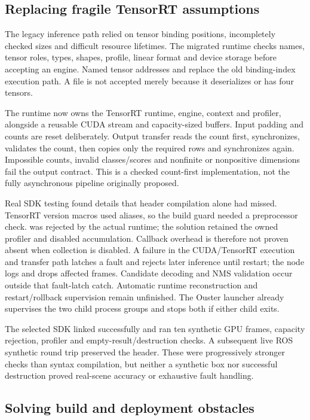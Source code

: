 \documentclass[11pt,a4paper]{article}
\newcommand{\code}[1]{\texttt{\detokenize{#1}}}
\begin{document}
\subsection{Replacing fragile TensorRT assumptions}

The legacy inference path relied on tensor binding positions, incompletely checked sizes and difficult resource lifetimes. The migrated runtime checks names, tensor roles, types, shapes, profile, linear format and device storage before accepting an engine. Named tensor addresses and \code{enqueueV3} replace the old binding-index execution path. A file is not accepted merely because it deserializes or has four tensors.

The runtime now owns the TensorRT runtime, engine, context and profiler, alongside a reusable CUDA stream and capacity-sized buffers. Input padding and counts are reset deliberately. Output transfer reads the count first, synchronizes, validates the count, then copies only the required rows and synchronizes again. Impossible counts, invalid classes/scores and nonfinite or nonpositive dimensions fail the output contract. This is a checked count-first implementation, not the fully asynchronous pipeline originally proposed.

Real SDK testing found details that header compilation alone had missed. TensorRT version macros used aliases, so the build guard needed a preprocessor check. \code{setProfiler(nullptr)} was rejected by the actual runtime; the solution retained the owned profiler and disabled accumulation. Callback overhead is therefore not proven absent when collection is disabled. A failure in the CUDA/TensorRT execution and transfer path latches a fault and rejects later inference until restart; the node logs and drops affected frames. Candidate decoding and NMS validation occur outside that fault-latch catch. Automatic runtime reconstruction and restart/rollback supervision remain unfinished. The Ouster launcher already supervises the two child process groups and stops both if either child exits.

The selected SDK linked successfully and ran ten synthetic GPU frames, capacity rejection, profiler and empty-result/destruction checks. A subsequent live ROS synthetic round trip preserved the header. These were progressively stronger checks than syntax compilation, but neither a synthetic box nor successful destruction proved real-scene accuracy or exhaustive fault handling.

\subsection{Solving build and deployment obstacles}
\end{document}
